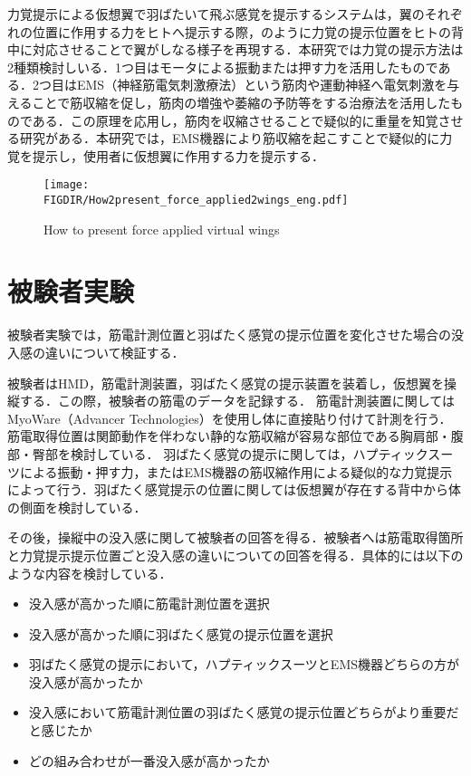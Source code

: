 \begin{small}
    力覚提示による仮想翼で羽ばたいて飛ぶ感覚を提示するシステムは，翼のそれぞれの位置に作用する力をヒトへ提示する際，のように力覚の提示位置をヒトの背中に対応させることで翼がしなる様子を再現する．本研究では力覚の提示方法は2種類検討しいる．1つ目はモータによる振動または押す力を活用したものである．2つ目はEMS（神経筋電気刺激療法）という筋肉や運動神経へ電気刺激を与えることで筋収縮を促し，筋肉の増強や萎縮の予防等をする治療法を活用したものである．この原理を応用し，筋肉を収縮させることで疑似的に重量を知覚させる研究がある\cite{小川剛史2017電気的筋肉刺激が重量知覚に及ぼす影響の分析}．本研究では，EMS機器により筋収縮を起こすことで疑似的に力覚を提示し，使用者に仮想翼に作用する力を提示する．



    \begin{figure}[t]
      \begin{center}
        \texttt{[image: \\FIGDIR/How2present\_force\_applied2wings\_eng.pdf]}%
        \caption{How to present force applied virtual wings}
      \end{center}
    \end{figure}



\section{被験者実験}
  被験者実験では，筋電計測位置と羽ばたく感覚の提示位置を変化させた場合の没入感の違いについて検証する．
    
  被験者はHMD，筋電計測装置，羽ばたく感覚の提示装置を装着し，仮想翼を操縦する．この際，被験者の筋電のデータを記録する．
  筋電計測装置に関してはMyoWare（Advancer Technologies）を使用し体に直接貼り付けて計測を行う．筋電取得位置は関節動作を伴わない静的な筋収縮が容易な部位である胸肩部・腹部・臀部を検討している．
  羽ばたく感覚の提示に関しては，ハプティックスーツによる振動・押す力，またはEMS機器の筋収縮作用による疑似的な力覚提示によって行う．羽ばたく感覚提示の位置に関しては仮想翼が存在する背中から体の側面を検討している．
  
  その後，操縦中の没入感に関して被験者の回答を得る．被験者へは筋電取得箇所と力覚提示提示位置ごと没入感の違いについての回答を得る．具体的には以下のような内容を検討している．
  \begin{itemize}
    \item 没入感が高かった順に筋電計測位置を選択 %
    \item 没入感が高かった順に羽ばたく感覚の提示位置を選択
    \item 羽ばたく感覚の提示において，ハプティックスーツとEMS機器どちらの方が没入感が高かったか
    \item 没入感において筋電計測位置の羽ばたく感覚の提示位置どちらがより重要だと感じたか
    \item どの組み合わせが一番没入感が高かったか
  \end{itemize}
    


\end{small}
